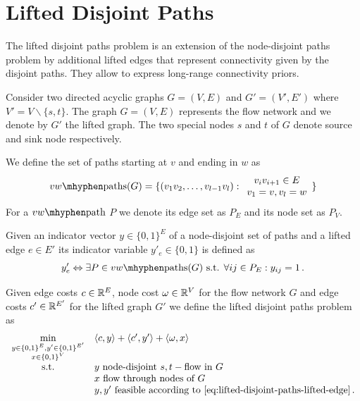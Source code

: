 \section{Lifted Disjoint Paths}
\label{sec:lifted-disjoint-paths}

The lifted disjoint paths problem is an extension of the node-disjoint paths problem by additional lifted edges that represent connectivity given by the disjoint paths.
They allow to express long-range connectivity priors.

\begin{definition}
Consider two directed acyclic graphs $G = (V, E)$ and $G' = (V',E')$ where $V' =V\backslash \{s,t\}$.
The graph $G=(V,E)$ represents the flow network and we denote by $G'$ the lifted graph.
The two special nodes $s$ and $t$ of $G$ denote source and sink node respectively.
\end{definition}

\begin{definition}[Paths]
We define the set of paths starting at $v$ and ending in $w$ as
\begin{equation}
vw\mhyphen\text{paths}(G) = \{
(v_1v_2,\ldots,v_{l-1}v_l) : \begin{array}{c} v_i v_{i+1} \in E \\ v_1 = v, v_l = w \end{array}
 \}
\end{equation}
For a $vw\mhyphen\text{path}$ $P$ we denote its edge set as $P_E$ and its node
set as $P_V$. 
\end{definition}

\begin{definition}
Given an indicator vector $y \in \{0,1\}^E$ of a node-disjoint set of paths and a lifted edge $e \in E'$ its indicator variable $y'_e \in \{0,1\}$ is defined as
\begin{equation}
\label{eq:lifted-disjoint-paths-lifted-edge}
y'_e \Leftrightarrow \exists P \in vw\mhyphen\text{paths}(G) \text{ s.t. } \forall ij \in P_E : y_{ij} = 1\,.
\end{equation}
\end{definition}

\begin{definition}
Given edge costs $c \in \mathbb{R}^E$, node cost $\omega \in \mathbb{R}^V$ for the flow network $G$ and edge costs $c' \in \mathbb{R}^{E'}$ for the lifted graph $G'$ we define the lifted disjoint paths problem as
\begin{equation}
\label{eq:lifted-disjoint-paths}
\begin{array}{cl}
\min\limits_{\substack{y \in \{0,1\}^E, y' \in \{0,1\}^{E'} \\ x \in \{0,1\}^V }} 
&
\langle c, y \rangle + \langle c', y' \rangle + \langle \omega, x \rangle \\
\text{s.t.}
& y \text{ node-disjoint } s,t-\text{flow in } G \\
& x \text{ flow through nodes of } G \\
& y,y' \text{ feasible according to~\eqref{eq:lifted-disjoint-paths-lifted-edge}}\,.
\end{array}
\end{equation}
\end{definition}

